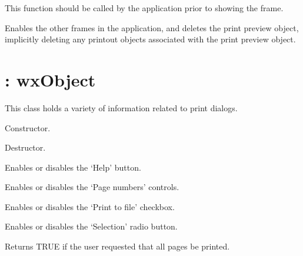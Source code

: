 This function should be called by the application prior to
showing the frame.



Enables the other frames in the application, and deletes the print preview
object, implicitly deleting any printout objects associated with the print
preview object.

\section{: wxObject}\label{wxprintdata}

This class holds a variety of information related to print dialogs.



Constructor.



Destructor.



Enables or disables the `Help' button.



Enables or disables the `Page numbers' controls.



Enables or disables the `Print to file' checkbox.



Enables or disables the `Selection' radio button.



Returns TRUE if the user requested that all pages be printed.

